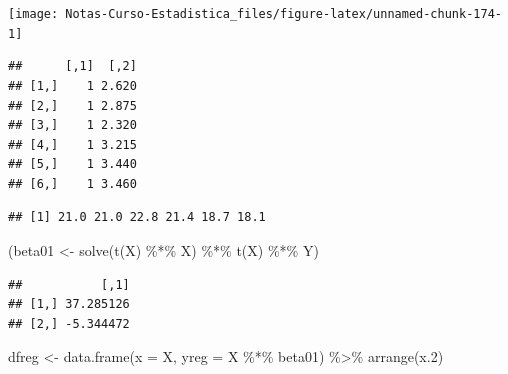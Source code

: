 \documentclass[
  12pt,
]{book}
\newenvironment{Shaded}{\begin{snugshade}}{\end{snugshade}}
\newcommand{\AttributeTok}[1]{\textcolor[rgb]{0.77,0.63,0.00}{#1}}
\newcommand{\DecValTok}[1]{\textcolor[rgb]{0.00,0.00,0.81}{#1}}
\newcommand{\FloatTok}[1]{\textcolor[rgb]{0.00,0.00,0.81}{#1}}
\newcommand{\FunctionTok}[1]{\textcolor[rgb]{0.00,0.00,0.00}{#1}}
\newcommand{\NormalTok}[1]{#1}
\newcommand{\OtherTok}[1]{\textcolor[rgb]{0.56,0.35,0.01}{#1}}
\newcommand{\SpecialCharTok}[1]{\textcolor[rgb]{0.00,0.00,0.00}{#1}}
\theoremstyle{definition}
\theoremstyle{definition}
\theoremstyle{definition}
\theoremstyle{remark}
\begin{document}
\begin{center}\texttt{[image: Notas-Curso-Estadistica\_files/figure-latex/unnamed-chunk-174-1]} \end{center}

\begin{Shaded}
\end{Shaded}

\begin{verbatim}
##      [,1]  [,2]
## [1,]    1 2.620
## [2,]    1 2.875
## [3,]    1 2.320
## [4,]    1 3.215
## [5,]    1 3.440
## [6,]    1 3.460
\end{verbatim}

\begin{Shaded}
\end{Shaded}

\begin{verbatim}
## [1] 21.0 21.0 22.8 21.4 18.7 18.1
\end{verbatim}

\begin{Shaded}
\begin{Highlighting}[]
\NormalTok{(beta01 }\OtherTok{\textless{}{-}} \FunctionTok{solve}\NormalTok{(}\FunctionTok{t}\NormalTok{(X) }\SpecialCharTok{\%*\%}\NormalTok{ X) }\SpecialCharTok{\%*\%} \FunctionTok{t}\NormalTok{(X) }\SpecialCharTok{\%*\%}\NormalTok{ Y)}
\end{Highlighting}
\end{Shaded}

\begin{verbatim}
##           [,1]
## [1,] 37.285126
## [2,] -5.344472
\end{verbatim}

\begin{Shaded}
\begin{Highlighting}[]
\NormalTok{dfreg }\OtherTok{\textless{}{-}} \FunctionTok{data.frame}\NormalTok{(}\AttributeTok{x =}\NormalTok{ X, }\AttributeTok{yreg =}\NormalTok{ X }\SpecialCharTok{\%*\%}\NormalTok{ beta01) }\SpecialCharTok{\%\textgreater{}\%} 
    \FunctionTok{arrange}\NormalTok{(x}\FloatTok{.2}\NormalTok{)}
\end{Highlighting}
\end{Shaded}
\end{document}
